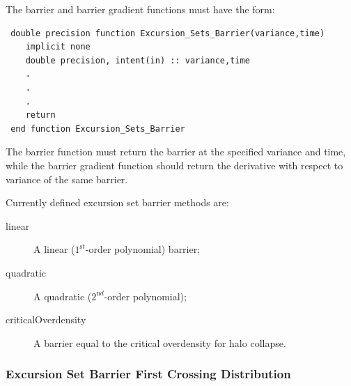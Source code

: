The barrier and barrier gradient functions must have the form:
\begin{verbatim}
 double precision function Excursion_Sets_Barrier(variance,time)
    implicit none
    double precision, intent(in) :: variance,time
    .
    .
    .
    return
 end function Excursion_Sets_Barrier
\end{verbatim}
The barrier function must return the barrier at the specified {\normalfont \ttfamily variance} and {\normalfont \ttfamily time}, while the barrier gradient function should return the derivative with respect to variance of the same barrier.

Currently defined excursion set barrier methods are:
\begin{description}
 \item [{\normalfont \ttfamily linear}] A linear ($1^{\mathrm st}$-order polynomial) barrier;
  \item [{\normalfont \ttfamily quadratic}] A quadratic ($2^{\mathrm nd}$-order polynomial);
  \item [{\normalfont \ttfamily criticalOverdensity}] A barrier equal to the critical overdensity for halo collapse.
\end{description}

\subsubsection{Excursion Set Barrier First Crossing Distribution}\label{sec:excursionSetFirstCrossingMethod}

